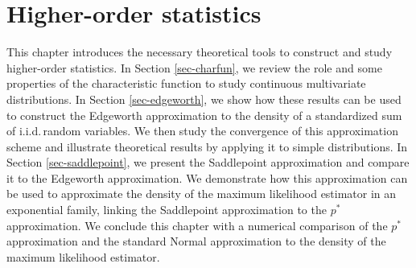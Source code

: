 \section{Higher-order statistics} \label{sec-ho-stats}

This chapter introduces the necessary theoretical tools to construct and study higher-order statistics. In Section \ref{sec-charfun}, we review the role and some properties of the characteristic function to study continuous multivariate distributions. In Section \ref{sec-edgeworth}, we show how these results can be used to construct the Edgeworth approximation to the density of a standardized sum of i.i.d.\,random variables. We then study the convergence of this approximation scheme and illustrate theoretical results by applying it to simple distributions. In Section \ref{sec-saddlepoint}, we present the Saddlepoint approximation and compare it to the Edgeworth approximation. We demonstrate how this approximation can be used to approximate the density of the maximum likelihood estimator in an exponential family, linking the Saddlepoint approximation to the $p^*$ approximation. We conclude this chapter with a numerical comparison of the $p^*$ approximation and the standard Normal approximation to the density of the maximum likelihood estimator.







